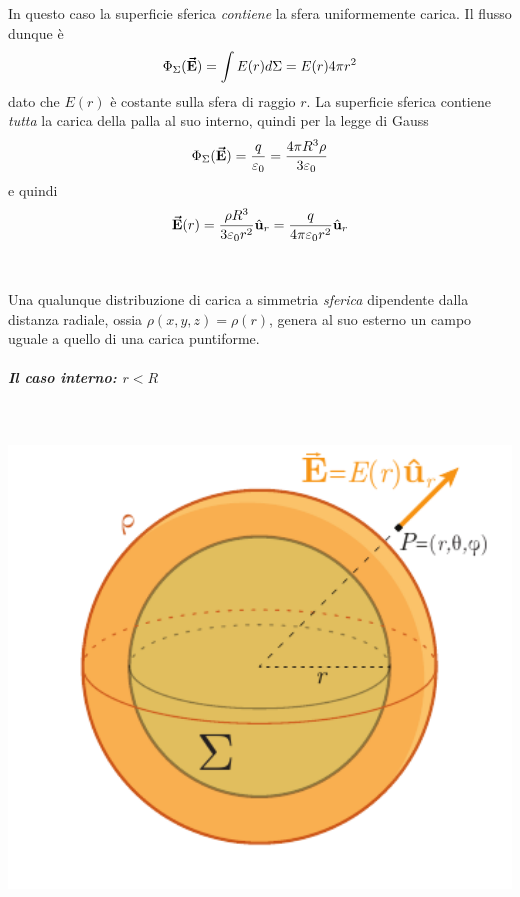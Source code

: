 \begin{minipage}{0.54\textwidth}
	In questo caso la superficie sferica \textit{contiene} la sfera uniformemente carica. Il flusso dunque è
	\begin{equation*}
		\Phi_{\Sigma}(\vb*{\va{E}})=\int E(r)d\Sigma=E(r)4\pi r^2
	\end{equation*}
	dato che $E(r)$ è costante sulla sfera di raggio $r$.
	La superficie sferica contiene \textit{tutta} la carica della palla al suo interno, quindi per la legge di Gauss
	\begin{equation*}
		\Phi_{\Sigma}(\vb*{\va{E}})=\frac{q}{\varepsilon_0}=\frac{4 \pi R^3\rho}{3\varepsilon_0}
	\end{equation*}
	e quindi
	\begin{equation}
		\vb*{\va{E}}(r)=\frac{\rho R^3}{3\varepsilon_0r^2}\hat{\mathbf{u}}_r=\frac{q}{4\pi\varepsilon_0 r^2}\hat{\mathbf{u}}_r
	\end{equation}
\end{minipage}\\
\begin{observe}
	Una qualunque distribuzione di carica a simmetria \textit{sferica} dipendente dalla distanza radiale, ossia $\rho(x,y,z)=\rho(r)$, genera al suo esterno un campo uguale a quello di una carica puntiforme.
\end{observe}
\subparagraph{Il caso interno: $r<R$}~\\
\begin{minipage}{0.45\textwidth}
	\begin{center}
		\includegraphics[width=1\textwidth]{images/chp2sferacarica2.pdf}
	\end{center}
\end{minipage}\hspace{5pt}
